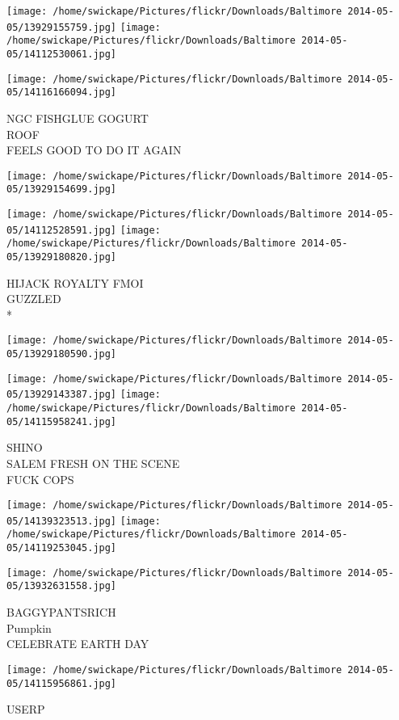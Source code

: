 \documentclass[10pt,letterpaper]{article}
\begin{document}
\texttt{[image: /home/swickape/Pictures/flickr/Downloads/Baltimore 2014-05-05/13929155759.jpg]}
\texttt{[image: /home/swickape/Pictures/flickr/Downloads/Baltimore 2014-05-05/14112530061.jpg]}

\vspace{0.25in}
\texttt{[image: /home/swickape/Pictures/flickr/Downloads/Baltimore 2014-05-05/14116166094.jpg]}

NGC FISHGLUE GOGURT\\
ROOF\\
FEELS GOOD TO DO IT AGAIN\\
\pagebreak

\texttt{[image: /home/swickape/Pictures/flickr/Downloads/Baltimore 2014-05-05/13929154699.jpg]}

\vspace{0.25in}
\texttt{[image: /home/swickape/Pictures/flickr/Downloads/Baltimore 2014-05-05/14112528591.jpg]}
\texttt{[image: /home/swickape/Pictures/flickr/Downloads/Baltimore 2014-05-05/13929180820.jpg]}

HIJACK ROYALTY FMOI\\
GUZZLED\\
*\\
\pagebreak

\texttt{[image: /home/swickape/Pictures/flickr/Downloads/Baltimore 2014-05-05/13929180590.jpg]}

\vspace{0.25in}
\texttt{[image: /home/swickape/Pictures/flickr/Downloads/Baltimore 2014-05-05/13929143387.jpg]}
\texttt{[image: /home/swickape/Pictures/flickr/Downloads/Baltimore 2014-05-05/14115958241.jpg]}

SHINO\\
SALEM FRESH ON THE SCENE\\
FUCK COPS\\
\pagebreak

\texttt{[image: /home/swickape/Pictures/flickr/Downloads/Baltimore 2014-05-05/14139323513.jpg]}
\texttt{[image: /home/swickape/Pictures/flickr/Downloads/Baltimore 2014-05-05/14119253045.jpg]}

\texttt{[image: /home/swickape/Pictures/flickr/Downloads/Baltimore 2014-05-05/13932631558.jpg]}

BAGGYPANTSRICH\\
Pumpkin\\
CELEBRATE EARTH DAY\\
\pagebreak

\texttt{[image: /home/swickape/Pictures/flickr/Downloads/Baltimore 2014-05-05/14115956861.jpg]}

USERP\\
\pagebreak
\end{document}
